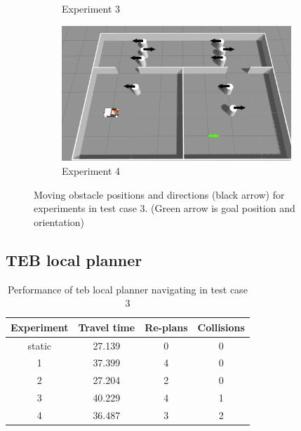 \begin{figure}[H]
\begin{subfigure}[b]{0.50\linewidth}
        \caption{Experiment 3}
    \end{subfigure}%
    \begin{subfigure}[b]{0.50\linewidth}
        \centering
        \includegraphics[width=0.95\textwidth]{images/test_case_3/exp4.png}
        \caption{Experiment 4}
    \end{subfigure}
    \caption{Moving obstacle positions and directions (black arrow) for experiments in test case 3.
    (Green arrow is goal position and orientation)}\label{fig:test_case_3_experiment_start}
\end{figure}

\subsection{TEB local planner}%
\label{sub:eval_teb_local_planner_tc3}

\begin{table}[H]
    \centering
    \begin{tabular}{cccc}
        \textbf{Experiment} & \textbf{Travel time} & \textbf{Re-plans} & \textbf{Collisions} \\\toprule
        static & 27.139 & 0 & 0 \\
             1 & 37.399 & 4 & 0 \\
             2 & 27.204 & 2 & 0 \\
             3 & 40.229 & 4 & 1 \\
             4 & 36.487 & 3 & 2 \\
    \end{tabular}
    \caption{Performance of teb local planner navigating in test case 3}\label{tab:perfomance_teb_test_case_3}
\end{table}

